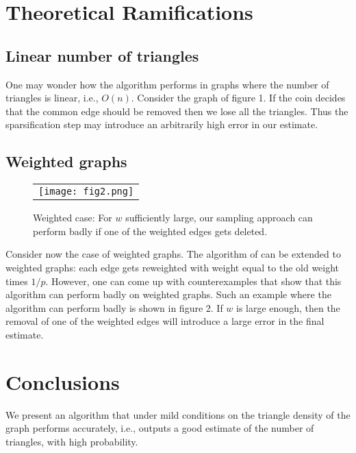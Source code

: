 \documentclass{llncs}
\begin{document}
\section{Theoretical Ramifications} 
\label{sec:ramifications}
\subsection{Linear number of triangles}

One may wonder how the algorithm performs in graphs where the number of triangles is linear, i.e., $O(n)$.
Consider the graph of figure 1. If the coin decides that the common
edge should be removed then we lose all the triangles. Thus the sparsification step may introduce 
an arbitrarily high error in our estimate.


\subsection{Weighted graphs}

\begin{figure}
    \begin{center}
        \begin{tabular}{c}
		    \texttt{[image: fig2.png]} \\
	  \end{tabular}	    
		\caption{ Weighted case: For $w$ sufficiently large, our sampling approach can perform badly if one of the weighted edges gets deleted. }
		\end{center}
	\label{fig:fig2}
\end{figure}

Consider now the case of weighted graphs. The algorithm of \cite{Tsourakakiskdd09}
can be extended to weighted graphs: each edge gets reweighted with weight equal to 
the old weight times $1/p$. 
However, one can come up with counterexamples that show that this algorithm 
can perform badly on weighted graphs.
Such an example where the algorithm can perform badly is shown in figure 2.
If $w$ is large enough, then the removal of one of the weighted edges will introduce 
a large error in the final estimate. 

\section{Conclusions}
\label{sec:concl}
We present an algorithm that under mild conditions on the triangle density of the graph
performs accurately, i.e., outputs a good estimate of the number of triangles, with high probability. 
\end{document}
